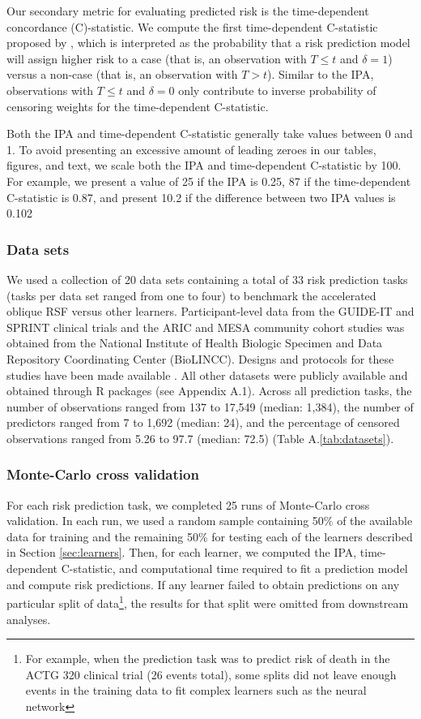 \documentclass{article}\usepackage[]{graphicx}\usepackage[]{xcolor}
\newcommand{\ie}{that is}
\newcommand{\secref}[1]{Section \ref{#1}}
\newcommand{\tabrefAppendix}[1]{Table A.\ref{#1}}
\begin{document}
Our secondary metric for evaluating predicted risk is the time-dependent concordance (C)-statistic. We compute the first time-dependent C-statistic proposed by \citet[][Equation~3]{blanche2013estimating}, which is interpreted as the probability that a risk prediction model will assign higher risk to a case (\ie, an observation with $T \leq t$ and $\delta = 1$) versus a non-case (\ie, an observation with $T > t$). Similar to the IPA, observations with $T \leq t$ and $\delta = 0$ only contribute to inverse probability of censoring weights for the time-dependent C-statistic.

Both the IPA and time-dependent C-statistic generally take values between 0 and 1. To avoid presenting an excessive amount of leading zeroes in our tables, figures, and text, we scale both the IPA and time-dependent C-statistic by 100. For example, we present a value of 25 if the IPA is 0.25, 87 if the time-dependent C-statistic is 0.87, and present 10.2 if the difference between two IPA values is 0.102

\subsubsection{Data sets}

We used a collection of 20 data sets containing a total of 33 risk prediction tasks (tasks per data set ranged from one to four) to benchmark the accelerated oblique RSF versus other learners. Participant-level data from the GUIDE-IT and SPRINT clinical trials and the ARIC and MESA community cohort studies was obtained from the National Institute of Health Biologic Specimen and Data Repository Coordinating Center (BioLINCC). Designs and protocols for these studies have been made available \citep{aric1989atherosclerosis, bild2002multi, felker2017effect, sprint2015randomized}. All other datasets were publicly available and obtained through R packages (see Appendix A.1). Across all prediction tasks, the number of observations ranged from 137 to 17,549 (median: 1,384), the number of predictors ranged from 7 to 1,692 (median: 24), and the percentage of censored observations ranged from 5.26 to 97.7 (median: 72.5) (\tabrefAppendix{tab:datasets}).

\subsubsection{Monte-Carlo cross validation}

For each risk prediction task, we completed 25 runs of Monte-Carlo cross validation. In each run, we used a random sample containing 50\% of the available data for training and the remaining 50\% for testing each of the learners described in \secref{sec:learners}. Then, for each learner, we computed the IPA, time-dependent C-statistic, and computational time required to fit a prediction model and compute risk predictions. If any learner failed to obtain predictions on any particular split of data\footnote{For example, when the prediction task was to predict risk of death in the ACTG 320 clinical trial (26 events total), some splits did not leave enough events in the training data to fit complex learners such as the neural network}, the results for that split were omitted from downstream analyses.
\end{document}
